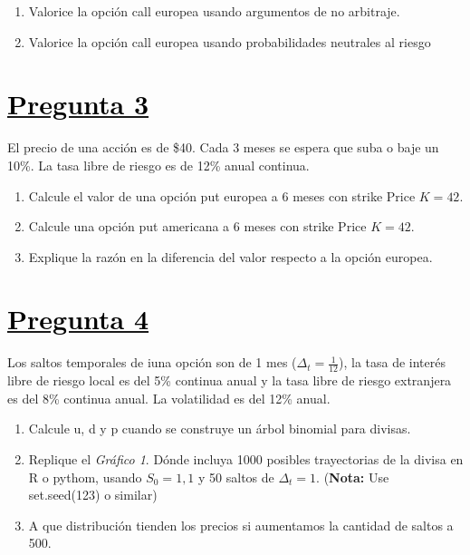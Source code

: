 \documentclass[12pt]{article}
\newcommand{\subrayadoRojo}[1]{{\color{rojoudp}\underline{\textcolor{black}{#1}}}}
\begin{document}
\begin{enumerate}[label=\textbf{\alph*)}]
    \item	Valorice la opción call europea usando argumentos de no arbitraje. 
    \item	Valorice la opción call europea usando probabilidades neutrales al riesgo
\end{enumerate}


\section*{\subrayadoRojo{Pregunta 3}}
El precio de una acción es de \$40. Cada 3 meses se espera que suba o baje un 10\%.
La tasa libre de riesgo es de 12\% anual continua. 

\begin{enumerate}[label=\textbf{\alph*)}]

    \item	Calcule el valor de una opción put europea a 6 meses con strike Price $K=42$.
    \item   Calcule una opción put americana a 6 meses con strike Price $K=42$.
    \item   Explique la razón en la diferencia del valor respecto a la opción europea.

\end{enumerate}

\section*{\subrayadoRojo{Pregunta 4}}
Los saltos temporales de iuna opción son de 1 mes ($\Delta_t=\frac{1}{12}$), la tasa de interés libre de riesgo 
local es del 5\% continua anual y la tasa libre de riesgo extranjera es del 8\% continua anual. 
La volatilidad es del 12\% anual.

\begin{enumerate}[label=\textbf{\alph*)}]
    \item   Calcule u, d y p cuando se construye un árbol binomial para divisas. 
    \item   Replique el \textit{Gráfico 1}. Dónde incluya 1000 posibles trayectorias de la divisa en R o pythom, usando $S_0=1,1$ y 50 saltos de $\Delta_t=1$. {\footnotesize(\textbf{Nota:} Use set.seed(123) o similar)}
    \item   A que distribución tienden los precios si aumentamos la cantidad de saltos a 500. 
\end{enumerate}
\end{document}
